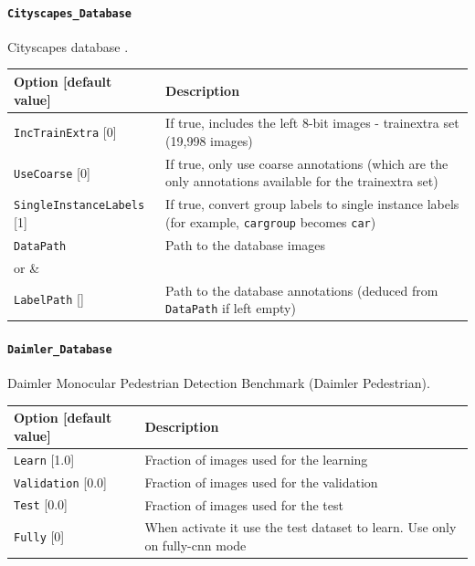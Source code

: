 \documentclass[a4paper,11pt,oneside]{article}
\begin{document}
\paragraph{\texorpdfstring{\lstinline[basicstyle=\ttfamily\bfseries]!Cityscapes_Database!}{Cityscapes\_Database}}
Cityscapes database \citep{Cordts2016Cityscapes}.

\begin{center}
 \begin{tabular}{| p{5cm} | p{10cm} | }
 \hline
 Option [default value] & Description\\
 \hline\hline
  \lstinline!IncTrainExtra! [0] & If true, includes the left 8-bit images -
  trainextra set (19,998 images) \\
  \lstinline!UseCoarse! [0] & If true, only use coarse annotations (which are
  the only annotations available for the trainextra set) \\
  \lstinline!SingleInstanceLabels! [1] & If true, convert group labels to single
  instance labels (for example, \lstinline!cargroup! becomes \lstinline!car!) \\
  \lstinline!DataPath! & Path to the database images \\
    or & \\
   \noindent [\lstinline!$CITYSCAPES_DATASET!] if defined & \\
  \lstinline!LabelPath! [] & Path to the database annotations
  (deduced from \lstinline!DataPath! if left empty) \\
 \hline
\end{tabular}
\end{center}


\paragraph{\texorpdfstring{%
\lstinline[basicstyle=\ttfamily\bfseries]!Daimler_Database!}{Daimler\_Database}}
Daimler Monocular Pedestrian Detection Benchmark (Daimler Pedestrian).

\begin{center}
 \begin{tabular}{| p{5cm} | p{10cm} | }
 \hline
 Option [default value] & Description\\
 \hline\hline
  \cellcolor{requiredcolor}
  \lstinline!Learn! [1.0] & Fraction of images used for the learning \\
  \lstinline!Validation! [0.0] & Fraction of images used for the validation \\
  \lstinline!Test! [0.0] & Fraction of images used for the test \\
  \lstinline!Fully! [0] & When activate it use the test dataset to learn.
  Use only on fully-cnn mode\\
 \hline
\end{tabular}
\end{center}
\end{document}
